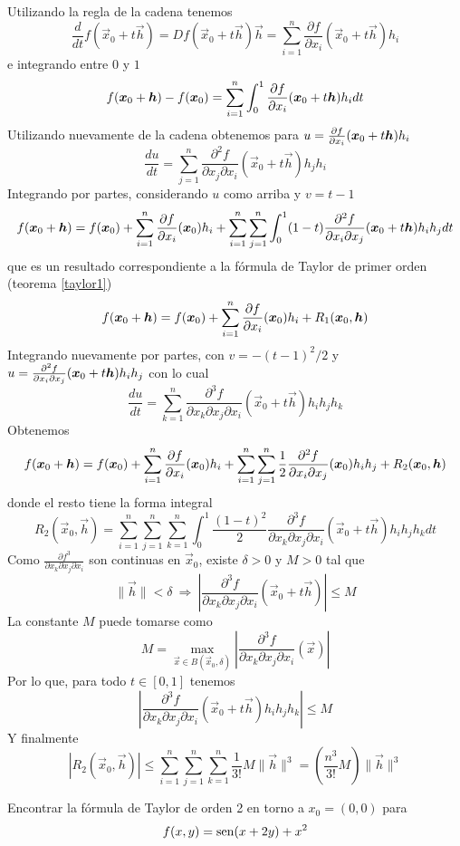 \begin{demostracion}
Utilizando  la regla de la cadena tenemos
$$\frac{d}{dt}f(\vec{x}_0+t\vec{h})=Df(\vec{x}_0+t\vec{h})\vec{h}=\sum_{i=1}^n\frac{\partial f}{\partial x_i}(\vec{x}_0+t\vec{h})h_i$$
e integrando entre $0$ y $1$
$$f(\boldsymbol{x}_0+\boldsymbol{h})-f(\boldsymbol{x}_0)=\sum_{i=1}^n\int_0^1\frac{\partial f}{\partial x_i}(\boldsymbol{x}_0+t\boldsymbol{h})h_idt$$
Utilizando nuevamente de la cadena obtenemos para $u=\frac{\partial f}{\partial x_i}(\boldsymbol{x}_0+t\boldsymbol{h})h_i$
$$\frac{du}{dt}=\sum_{j=1}^n\frac{\partial^2 f}{\partial x_j\partial x_i}(\vec{x}_0+t\vec{h})h_j h_i$$ 
Integrando por partes, considerando $u$ como arriba y $v=t-1$ 
$$f(\boldsymbol{x}_0+\boldsymbol{h})=f(\boldsymbol{x}_0)+\sum_{i=1}^n\frac{\partial f}{\partial x_i}(\boldsymbol{x}_0)h_i+\sum_{i=1}^n\sum_{j=1}^n\int_0^1(1-t)\frac{\partial^2 f}{\partial x_i\partial x_j}(\boldsymbol{x}_0+t\boldsymbol{h})h_ih_jdt$$
que es un resultado correspondiente a la f\'ormula de Taylor de primer
orden (teorema \ref{taylor1})
$$f(\boldsymbol{x}_0+\boldsymbol{h})=f(\boldsymbol{x}_0)+\sum_{i=1}^n\frac{\partial f}{\partial x_i}(\boldsymbol{x}_0)h_i+R_1(\boldsymbol{x}_0,\boldsymbol{h})$$
Integrando nuevamente por partes, con $v=-{(t-1)^2}/{2}$ y  $u=\frac{\partial^2 f}{\partial x_i\partial x_j}(\boldsymbol{x}_0+t\boldsymbol{h})h_ih_j$ con lo cual
$$\frac{du}{dt}=\sum_{k=1}^n\frac{\partial^3 f}{\partial x_k\partial x_j\partial x_i}(\vec{x}_0+t\vec{h})h_ih_jh_k$$
Obtenemos
$$f(\boldsymbol{x}_0+\boldsymbol{h})=f(\boldsymbol{x}_0)+\sum_{i=1}^n\frac{\partial f}{\partial x_i}(\boldsymbol{x}_0)h_i+\sum_{i=1}^n\sum_{j=1}^n\frac{1}{2}\frac{\partial^2 f}{\partial x_i\partial x_j}(\boldsymbol{x}_0)h_ih_j+R_2(\boldsymbol{x}_0,\boldsymbol{h})$$
donde el resto tiene la forma integral
$$R_2(\vec{x}_0,\vec{h})=\sum_{i=1}^n\sum_{j=1}^n\sum_{k=1}^n\int_0^1\frac{(1-t)^2}{2}\frac{\partial^3 
f}{\partial x_k\partial x_j\partial x_i}(\vec{x}_0+t\vec{h})h_ih_jh_kdt $$
Como $\frac{\partial f^3}{\partial x_k\partial x_j\partial x_i}$ son continuas en $\vec{x}_0$, existe $\delta>0$
y $M>0$ tal que
$$\|\vec{h}\|<\delta\:\Rightarrow\: 
\left|\frac{\partial^3 f}{\partial x_k\partial x_j\partial x_i}(\vec{x}_0+t\vec{h})\right|\leq M$$
La constante $M$ puede tomarse como
$$M=\max_{\vec{x}\in B(\vec{x}_0,\delta)}\left|\frac{\partial^3 f}{\partial
x_k\partial x_j\partial x_i}(\vec{x})\right| $$
Por lo que, para todo $t\in[0,1]$ tenemos   
$$\left|\frac{\partial^3
f}{\partial x_k\partial x_j\partial x_i}(\vec{x}_0+t\vec{h})h_ih_jh_k\right|\leq M$$
Y finalmente
$$|R_2(\vec{x}_0,\vec{h})|\leq\sum_{i=1}^n\sum_{j=1}^n\sum_{k=1}^n
\frac{1}{3!}M\|\vec{h}\|^3=\left(\frac{n^3}{3!}M\right)\|\vec{h}\|^3$$
\end{demostracion}

\begin{ejemplo}
Encontrar la f\'ormula de Taylor de orden 2 en torno a $x_0=(0,0)$
para
\[ f(x,y)=\text{sen}(x+2y) +x^2 \]
\end{ejemplo}

